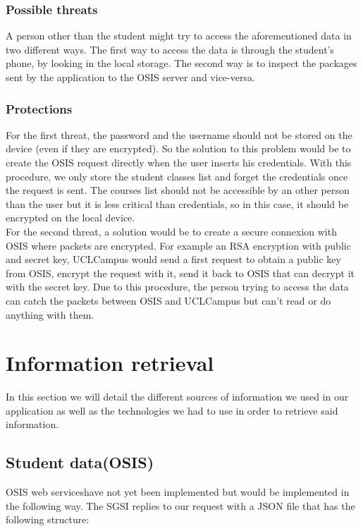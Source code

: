 \documentclass{eplmastersthesis}
\begin{document}
\subsubsection{Possible threats}
A person other than the student might try to access the aforementioned data in two different ways. The first way to access the data is through the student's phone, by looking in the local storage. The second way is to inspect the packages sent by the application to the OSIS server and vice-versa. 

\subsubsection{Protections}
For the first threat, the password and the username should not be stored on the device (even if they are encrypted). So the solution to this problem would be to create the OSIS request directly when the user inserts his credentials. With this procedure, we only store the student classes list and forget the credentials once the request is sent. The courses list should not be accessible by an other person than the user but it is less critical than credentials, so in this case, it should be encrypted on the local device. \\

For the second threat, a solution would be to create a secure connexion with OSIS where packets are encrypted. For example an RSA encryption with public and secret key, UCLCampus would send a first request to obtain a public key from OSIS, encrypt the request with it, send it back to OSIS that can decrypt it with the secret key. Due to this procedure, the person trying to access the data can catch the packets between OSIS and UCLCampus but can't read or do anything with them.
\section{Information retrieval}

In this section we will detail the different sources of information we used in our application as well as the technologies we had to use in order to retrieve said information. 
\subsection{Student data(OSIS)}

OSIS web serviceshave not yet been implemented but would be implemented in the following way. The SGSI replies to our request with a JSON file that has the following structure:
\end{document}
